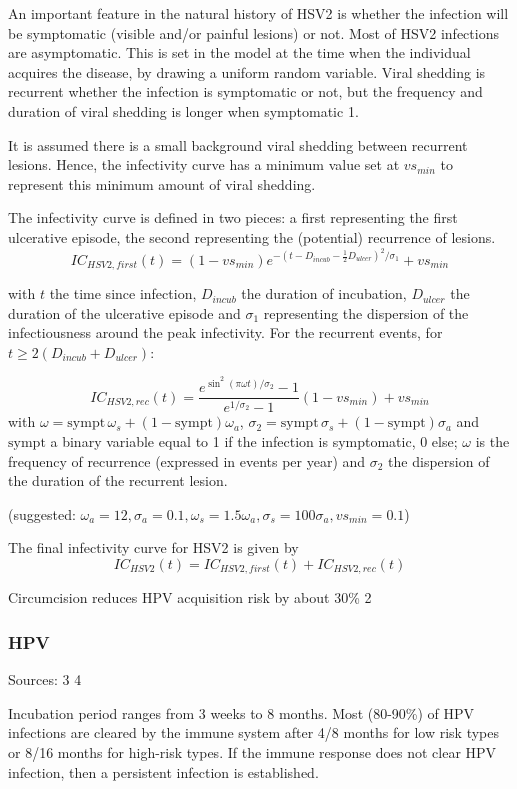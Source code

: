 \documentclass[11pt, onecolumn]{article}
\begin{document}
An important feature in the natural history of HSV2 is whether the infection will be symptomatic (visible and/or painful lesions) or not.
Most of HSV2 infections are asymptomatic. This is set in the model at the time when the individual acquires the disease, by drawing a uniform random variable. Viral shedding is recurrent whether the infection is symptomatic or not, but the frequency and duration of viral shedding is longer when symptomatic 1. 

It is assumed there is a small background viral shedding between recurrent lesions. Hence, the infectivity curve has a minimum value set at $vs_{min}$ to represent this minimum amount of viral shedding. 

The infectivity curve is defined in two pieces: a first representing the first ulcerative episode, the second representing the (potential) recurrence of lesions.
$$IC_{HSV2,first}(t) = (1-vs_{min})e^{-(t-D_{incub}-\frac{1}{2}D_{ulcer})^2 / \sigma_1}+vs_{min}$$

with $t$ the time since infection, $D_{incub}$ the duration of incubation, $D_{ulcer}$ the duration of the ulcerative episode and $\sigma_1$ representing the dispersion of the infectiousness around the peak infectivity.
For the recurrent events, for $t \geq 2(D_{incub}+D_{ulcer})$:

$$ IC_{HSV2,rec}(t) =  \frac{e^{\sin^2(\pi\omega t)/\sigma_2}-1}{e^{1/\sigma_2}-1}  (1-vs_{min})+ vs_{min}$$
with $\omega = \mathrm{sympt}\,\omega_s + (1- \mathrm{sympt})\omega_a$, $\sigma_2 = \mathrm{sympt}\,\sigma_s + (1- \mathrm{sympt})\sigma_a$ and  $ \mathrm{sympt}$ a binary variable equal to 1 if the infection is symptomatic, 0 else; $\omega$ is the frequency of recurrence (expressed in events per year) and $\sigma_2$ the dispersion of the duration of the recurrent lesion.

(suggested: $\omega_a=12, \sigma_a=0.1, \omega_s=1.5\omega_a, \sigma_s=100\sigma_a, vs_{min}=0.1$) 

The final infectivity curve for HSV2 is given by
$$IC_{HSV2}(t) = IC_{HSV2,first}(t) + IC_{HSV2,rec}(t)   $$


Circumcision reduces HPV acquisition risk by about 30\% 2


\subsubsection{HPV}

Sources: 3 4


Incubation period ranges from 3 weeks to 8 months. Most (80-90\%) of HPV infections are cleared by the immune system after 4/8 months for low risk types or 8/16 months for high-risk types. If the immune response does not clear HPV infection, then a persistent infection is established.
\end{document}
